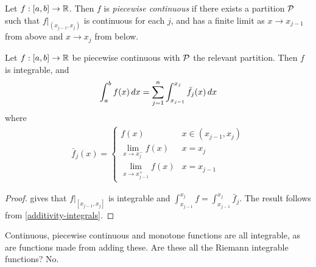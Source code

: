 \documentclass{../template/note}
\begin{document}
    \begin{definition}
        Let \(f: [a, b] \to \mathbb R\). Then \(f\) is \emph{piecewise continuous} if there exists a partition \(\mathcal{P}\) such that \(\left.f\right|_{(x_{j-1},x_j)}\) is continuous for each \(j\), and has a finite limit as \(x \to x_{j-1}\) from above and \(x \to x_j\) from below.
    \end{definition}
    
    \begin{proposition}
        Let \(f: [a, b] \to \mathbb R\) be piecewise continuous with \(\mathcal{P}\) the relevant partition. Then \(f\) is integrable, and
        \begin{align*}
            \int_a^b f(x) \,d{x} = \sum_{j=1}^n \int_{x_{j-1}}^{x_j} \bar{f}_j(x) \,d{x}
        \end{align*}
        where
        \begin{align*}
            \bar f_j(x) = \begin{cases}
                f(x) & x \in (x_{j-1}, x_j) \\
                \lim_{x \to x_j^-}f(x) & x = x_j \\
                \lim_{x \to x_{j-1}^+}f(x) & x = x_{j-1}
            \end{cases}
        \end{align*}
    \end{proposition}

    \begin{proof}
         gives that \(\left.f\right|_{[x_{j-1},x_j]}\) is integrable and \(\int_{x_{j-1}}^{x_j} f = \int_{x_{j-1}}^{x_j} \bar f_j\). The result follows from \cref{additivity-integrals}.
    \end{proof}

    Continuous, piecewise continuous and monotone functions are all integrable, as are functions made from adding these. Are these all the Riemann integrable functions? No.
\end{document}
